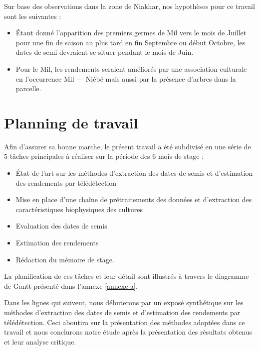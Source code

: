 \vspace{5mm} %

Sur base des observations dans la zone de Niakhar, nos hypothèses pour ce travail sont les suivantes :
  \begin{itemize}
   \item \'Etant donné l'apparition des premiers germes de Mil vers le mois de Juillet pour une fin de saison au 
   plus tard en fin Septembre ou début Octobre, les dates de semi devraient se situer pendant le mois de Juin. 
   \item Pour le Mil, les rendements seraient améliorés par une association culturale en l'occurrence Mil --- Niébé mais aussi par la présence d'arbres dans la parcelle.
  \end{itemize}

\section{Planning de travail}
Afin d'assurer sa bonne marche, le présent travail a été subdivisé en une série de 5 tâches principales à réaliser sur la période des 6 mois de stage :
  \begin{itemize}
   \item \'Etat de l'art sur les méthodes d'extraction des dates de semis et d'estimation des rendements par télédétection
   \item Mise en place d'une chaîne de prétraitements des données et d'extraction des caractéristiques biophysiques des cultures
   \item Evaluation des dates de semis
   \item Estimation des rendements
   \item Rédaction du mémoire de stage.
  \end{itemize}
La planification de ces tâches et leur détail sont illustrés \`a travers le diagramme de Gantt présenté dans l'annexe \ref{annexe-a}.

\vspace{5mm} %

Dans les lignes qui suivent, nous débuterons par un exposé synthétique sur les méthodes d'extraction des dates de semis et d'estimation des rendements par télédétection. 
Ceci aboutira sur la présentation des méthodes adoptées dans ce travail et nous conclurons notre étude après la présentation des résultats obtenus et leur analyse critique.